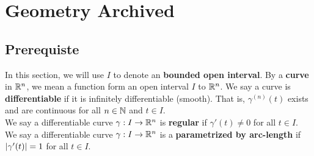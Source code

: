 \documentclass{report}
\begin{document}
\chapter{Geometry Archived}
\section{Prerequiste}
\begin{mdframed}
In this section, we will use $I$ to denote an \textbf{bounded open interval}. By a \textbf{curve} in $\mathbb{R}^n$, we mean a function form an open interval $I$ to $\mathbb{R}^n$.  We say a curve is \textbf{differentiable} if it is infinitely differentiable (smooth). That is, $\gamma ^{(n)}(t)$ exists and are continuous for all $n\in\mathbb{N}$ and $t \in I$.\\

We say a differentiable curve $\gamma  :I\rightarrow \mathbb{R}^n$ is \textbf{regular} if $\gamma '(t)\neq 0$ for all $t  \in I$. We say a differentiable curve $\gamma :I\rightarrow \mathbb{R}^n$ is a \textbf{parametrized by arc-length} if $\left|\gamma '(t)\right|=1$ for all $t \in I$. 
\end{mdframed}
\end{document}
